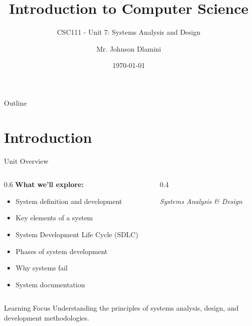 \documentclass[aspectratio=169]{beamer}
\title[University of Eswatini]{Introduction to Computer Science}
\subtitle{CSC111 - Unit 7: Systems Analysis and Design}
\author[J.S.D]{Mr. Johnson Dlamini}
\institute[jsdlamini@uniswa.sz]{The University of Eswatini}
\date{\today}
\begin{document}
\frame{\titlepage}

\begin{frame}{Outline}
    \tableofcontents
\end{frame}

\section{Introduction}

\begin{frame}{Unit Overview}
    \begin{columns}
        \begin{column}{0.6\textwidth}
            \textbf{What we'll explore:}
            \begin{itemize}
                \item System definition and development
                \item Key elements of a system
                \item System Development Life Cycle (SDLC)
                \item Phases of system development
                \item Why systems fail
                \item System documentation
            \end{itemize}
        \end{column}
        \begin{column}{0.4\textwidth}
            \centering
            \faLaptopCode
            
            \vspace{1cm}
            {\Large \faCogs}
            
            \small{\textit{Systems Analysis \& Design}}
        \end{column}
    \end{columns}
    
    \vspace{0.5cm}
    \begin{alertblock}{Learning Focus}
        Understanding the principles of systems analysis, design, and development methodologies.
    \end{alertblock}
\end{frame}
\end{document}
